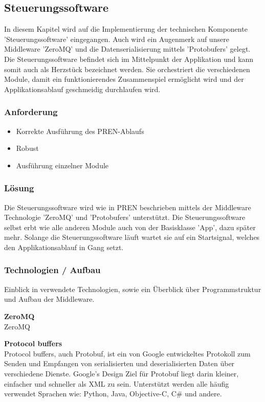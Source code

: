 \documentclass[../../main.tex]{subfiles}
\begin{document}
\subsection{Steuerungssoftware} \label{it_steuerungssoftware}
In diesem Kapitel wird auf die Implementierung der technischen Komponente 'Steuerungssoftware' eingegangen. Auch wird ein Augenmerk auf unsere Middleware 'ZeroMQ' und die Datenserialisierung mittels 'Protobufers' gelegt. Die Steuerungssoftware befindet sich im Mittelpunkt der Applikation und kann somit auch als Herzstück bezeichnet werden. Sie orchestriert die verschiedenen Module, damit ein funktionierendes Zusammenspiel ermöglicht wird und der Applikationsablauf geschmeidig durchlaufen wird.

\subsubsection{Anforderung}

\begin{itemize}
    \item Korrekte Ausführung des PREN-Ablaufs
    \item Robust
    \item Ausführung einzelner Module
\end{itemize}

\subsubsection{Lösung}
Die Steuerungssoftware wird wie in PREN beschrieben mittels der Middleware Technologie 'ZeroMQ' und 'Protobufers' unterstützt. Die Steuerungssoftware selbst erbt wie alle anderen Module auch von der Basisklasse 'App', dazu später mehr. Solange die Steuerungssoftware läuft wartet sie auf ein Startsignal, welches den Applikationsablauf in Gang setzt.

\subsubsection{Technologien / Aufbau}
Einblick in verwendete Technologien, sowie ein Überblick über Programmstruktur und Aufbau der Middleware. 

\textbf{ZeroMQ} \\
ZeroMQ 

\textbf{Protocol buffers} \\
Protocol buffers, auch Protobuf, ist ein von Google entwickeltes Protokoll zum Senden und Empfangen von serialisierten und deserialisierten Daten über verschiedene Dienste. Google's Design Ziel für Protobuf liegt darin kleiner, einfacher und schneller als XML zu sein. Unterstützt werden alle häufig verwendet Sprachen wie: Python, Java, Objective-C, C\# und andere.
\end{document}
